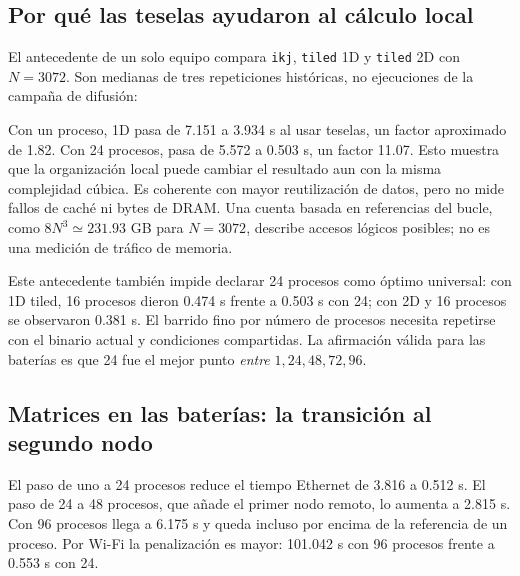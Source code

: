 \subsection{Por qué las teselas ayudaron al cálculo local}

El antecedente de un solo equipo compara \texttt{ikj}, \texttt{tiled} 1D y \texttt{tiled} 2D con $N=3072$. Son medianas de tres repeticiones históricas, no ejecuciones de la campaña de difusión:

\begin{table}[H]\caption{Antecedente local: tiempos totales en segundos. Los casos 2D requieren un número cuadrado de procesos.}

\end{table}

Con un proceso, 1D pasa de 7.151 a 3.934 s al usar teselas, un factor aproximado de 1.82. Con 24 procesos, pasa de 5.572 a 0.503 s, un factor 11.07. Esto muestra que la organización local puede cambiar el resultado aun con la misma complejidad cúbica. Es coherente con mayor reutilización de datos, pero no mide fallos de caché ni bytes de DRAM. Una cuenta basada en referencias del bucle, como $8N^3\simeq231.93$ GB para $N=3072$, describe accesos lógicos posibles; no es una medición de tráfico de memoria.

Este antecedente también impide declarar 24 procesos como óptimo universal: con 1D tiled, 16 procesos dieron 0.474 s frente a 0.503 s con 24; con 2D y 16 procesos se observaron 0.381 s. El barrido fino por número de procesos necesita repetirse con el binario actual y condiciones compartidas. La afirmación válida para las baterías es que 24 fue el mejor punto \emph{entre} $1,24,48,72,96$.

\subsection{Matrices en las baterías: la transición al segundo nodo}

\begin{table}[H]\caption{Primera batería, $N=3072$. $S_P=T_1/T_P$ se calcula dentro de cada red. Una corrida por celda.}

\end{table}

El paso de uno a 24 procesos reduce el tiempo Ethernet de 3.816 a 0.512 s. El paso de 24 a 48 procesos, que añade el primer nodo remoto, lo aumenta a 2.815 s. Con 96 procesos llega a 6.175 s y queda incluso por encima de la referencia de un proceso. Por Wi-Fi la penalización es mayor: 101.042 s con 96 procesos frente a 0.553 s con 24.

